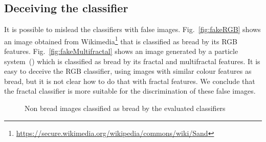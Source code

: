 \documentclass[oneside,a4paper,english,links]{amca}
\begin{document}
\subsection{Deceiving the classifier}
It is possible to mislead the classifiers with false images. Fig.~\ref{fig:fakeRGB} shows an image obtained from Wikimedia\footnote{\url{https://secure.wikimedia.org/wikipedia/commons/wiki/Sand}} that is classified as bread by its RGB features. Fig.~\ref{fig:fakeMultifractal} shows an image generated by a particle system~(\cite{Baravalle2011}) which is classified as bread by its fractal and multifractal features. It is easy to deceive the RGB classifier, using images with similar colour features as bread, but it is not clear how to do that with fractal features. We conclude that the fractal classifier is more suitable for the discrimination of these false images.

\begin{figure}
\begin{centering}
\par\end{centering}
\caption{Non bread images classified as bread by the evaluated classifiers}
\end{figure}
\end{document}
